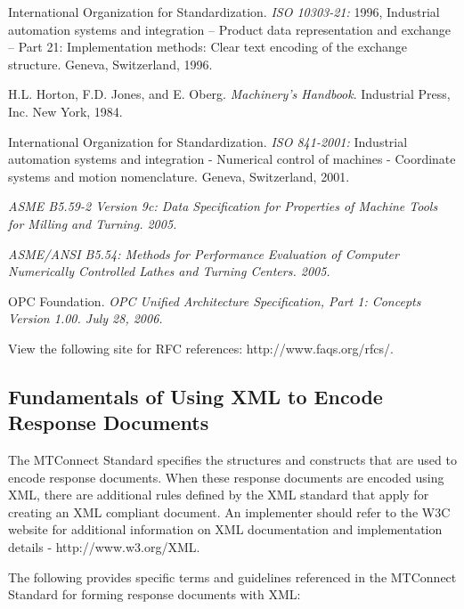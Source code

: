 International Organization for Standardization. \textit{ISO 10303-21:} 1996, Industrial automation systems and integration -- Product data representation and exchange -- Part 21: Implementation methods: Clear text encoding of the exchange structure. Geneva, Switzerland, 1996.

H.L. Horton, F.D. Jones, and E. Oberg. \textit{Machinery's Handbook}. Industrial Press, Inc. New York, 1984.

International Organization for Standardization. \textit{ISO 841-2001:} Industrial automation systems and integration - Numerical control of machines - Coordinate systems and motion nomenclature. Geneva, Switzerland, 2001.

\textit{ASME B5.59-2 Version 9c: Data Specification for Properties of Machine Tools for Milling and Turning. 2005.}

\textit{ASME/ANSI B5.54: Methods for Performance Evaluation of Computer Numerically Controlled Lathes and Turning Centers. 2005.}

OPC Foundation. \textit{OPC Unified Architecture Specification, Part 1: Concepts Version 1.00. July 28, 2006.}

View the following site for RFC references: http://www.faqs.org/rfcs/.

\pagebreak

\subsection{Fundamentals of Using XML to Encode Response Documents}
\label{appendix:A}

The MTConnect Standard specifies the structures and constructs that are used to encode \glspl{response document}.  When these \glspl{response document} are encoded using XML, there are additional rules defined by the XML standard that apply for creating an XML compliant document.  An implementer should refer to the W3C website for additional information on XML documentation and implementation details - http://www.w3.org/XML.

The following provides specific terms and guidelines referenced in the MTConnect Standard for forming \glspl{response document} with XML:  

